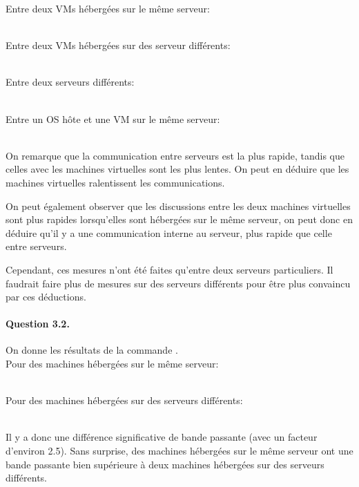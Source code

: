 \documentclass[12pt]{article}
\begin{document}
Entre deux VMs hébergées sur le même serveur:

\\

Entre deux VMs hébergées sur des serveur différents:

\\

Entre deux serveurs différents:

\\

Entre un OS hôte et une VM sur le même serveur:

\\

On remarque que la communication entre serveurs est la plus rapide, tandis que celles avec les machines virtuelles sont les plus lentes. On peut en déduire que les machines virtuelles ralentissent les communications.

On peut également observer que les discussions entre les deux machines virtuelles sont plus rapides lorsqu'elles sont hébergées sur le même serveur, on peut donc en déduire qu'il y a une communication interne au serveur, plus rapide que celle entre serveurs.

Cependant, ces mesures n'ont été faites qu'entre deux serveurs particuliers. Il faudrait faire plus de mesures sur des serveurs différents pour être plus convaincu par ces déductions. 

\paragraph{Question 3.2.}
On donne les résultats de la commande .
\\

Pour des machines hébergées sur le même serveur:

\\

Pour des machines hébergées sur des serveurs différents:

\\

Il y a donc une différence significative de bande passante (avec un facteur d'environ 2.5). Sans surprise, des machines hébergées sur le même serveur ont une bande passante bien supérieure à deux machines hébergées sur des serveurs différents.
\end{document}
